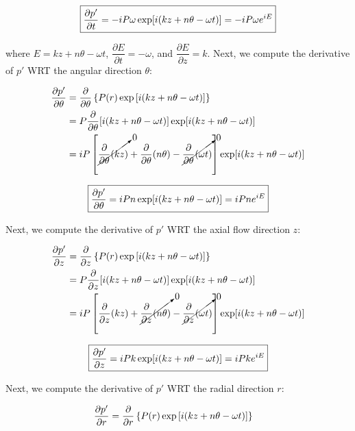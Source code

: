 \documentclass[]{aiaa-tc}%
\begin{document}
\begin{equation} \label{dpdt}
\boxed{\dfrac{\partial p'}{\partial t}
  = -iP\omega \exp[i(kz + n\theta -\omega t)] = -iP\omega e^{iE} }
\end{equation}

\noindent where $E=kz + n\theta -\omega t$, $\dfrac{\partial E}{\partial t} = -\omega$, and $\dfrac{\partial E}{\partial z} = k$.  Next, we compute the derivative of $p'$ WRT the angular direction $\theta$:

\begin{align*}
\dfrac{\partial p'}{\partial \theta} &= \dfrac{\partial}{\partial \theta}
  \left\{ P(r) \exp\left[ i(kz + n\theta -\omega t) \right]\right\} \\
&= P \dfrac{\partial}{\partial \theta} [i(kz + n\theta -\omega t)] \exp[i(kz + n\theta -\omega t)] \\
&= iP \left[\cancelto{0}{\dfrac{\partial}{\partial \theta}(kz)      }
                      + \dfrac{\partial}{\partial \theta}(n\theta)
          - \cancelto{0}{\dfrac{\partial}{\partial \theta}(\omega t)}
    \right] \exp[i(kz + n\theta -\omega t)]
\end{align*}

\begin{equation} \label{dpdtheta}
\boxed{\dfrac{\partial p'}{\partial \theta} = iPn \exp[i(kz + n\theta -\omega t)] = iPn e^{iE} }
\end{equation}


Next, we compute the derivative of $p'$ WRT the axial flow direction $z$:



\begin{align*}
\dfrac{\partial p'}{\partial z} &= \dfrac{\partial}{\partial z}
  \left\{ P(r) \exp\left[ i(kz + n\theta -\omega t) \right]\right\} \\
&= P \dfrac{\partial}{\partial z} [i(kz + n\theta -\omega t)] \exp[i(kz + n\theta -\omega t)] \\
&= iP \left[             \dfrac{\partial}{\partial z}(kz)
          + \cancelto{0}{\dfrac{\partial}{\partial z}(n\theta)}
          - \cancelto{0}{\dfrac{\partial}{\partial z}(\omega t)}
    \right] \exp[i(kz + n\theta -\omega t)]
\end{align*}

\begin{equation} \label{dpdz}
\boxed{\dfrac{\partial p'}{\partial z} = iPk \exp[i(kz + n\theta -\omega t)] = iPk e^{iE} }
\end{equation}


Next, we compute the derivative of $p'$ WRT the radial direction $r$:

\begin{align*}
\dfrac{\partial p'}{\partial r} &= \dfrac{\partial}{\partial r}
  \left\{ P(r) \exp\left[ i(kz + n\theta -\omega t) \right]\right\}
\end{align*}
\end{document}
